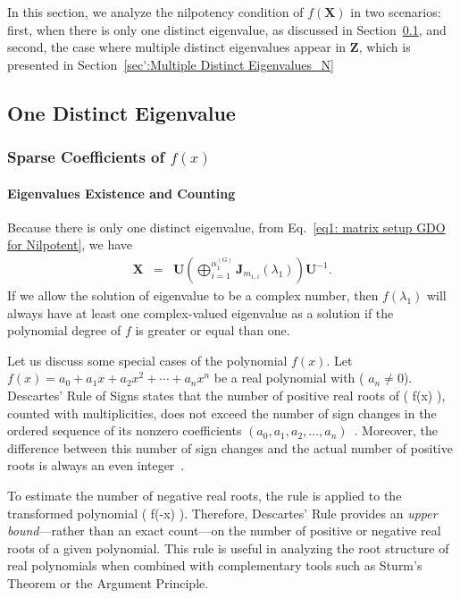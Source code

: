 \documentclass[11pt]{article}
\begin{document}
In this section, we analyze the nilpotency condition of $f(\bm{X})$ in two scenarios: first, when there is only one distinct eigenvalue, as discussed in Section~\ref{sec:One Distinct Eigenvalue_N}, and second, the case where multiple distinct eigenvalues appear in $\bm{Z}$, which is presented in Section~\ref{sec':Multiple Distinct Eigenvalues_N}

\subsection{One Distinct Eigenvalue}\label{sec:One Distinct Eigenvalue_N}

\subsubsection{Sparse Coefficients of $f(x)$}\label{sec:S_One Distinct Eigenvalue_N}

\paragraph{Eigenvalues Existence and Counting}\label{sec:eig_exist_count_S_One Distinct Eigenvalue_N}

Because there is only one distinct eigenvalue, from Eq.~\eqref{eq1: matrix setup GDO for Nilpotent}, we have 
%
\begin{eqnarray}\label{eq1:S_One Distinct Eigenvalue_N}
\bm{X}&=& \bm{U}\left(\bigoplus\limits_{i=1}^{\alpha_{1}^{(\mathrm{G})}}\bm{J}_{m_{1,i}}(\lambda_{1})\right)\bm{U}^{-1}.
\end{eqnarray}
%
If we allow the solution of eigenvalue to be a complex number, then $f(\lambda_1)$ will always have at least one complex-valued eigenvalue as a solution if the polynomial degree of $f$ is greater or equal than one. 

Let us discuss some special cases of the polynomial $f(x)$. Let $f(x) = a_0 + a_1 x + a_2 x^2 + \cdots + a_n x^n$ be a real polynomial with ( $a_n \neq 0$). Descartes’ Rule of Signs states that the number of positive real roots of ( f(x) ), counted with multiplicities, does not exceed the number of sign changes in the ordered sequence of its nonzero coefficients $(a_0, a_1, a_2, \ldots, a_n)$~\cite{machi2012algebra}. Moreover, the difference between this number of sign changes and the actual number of positive roots is always an even integer~\cite{Stoer2002Introduction,basu2006algorithms}.

To estimate the number of negative real roots, the rule is applied to the transformed polynomial ( f(-x) ). Therefore, Descartes’ Rule provides an \emph{upper bound}—rather than an exact count—on the number of positive or negative real roots of a given polynomial. This rule is useful in analyzing the root structure of real polynomials when combined with complementary tools such as Sturm’s Theorem or the Argument Principle.
\end{document}
